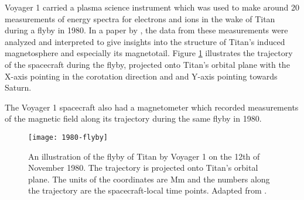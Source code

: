 \documentclass[12pt, parskip=full*, abstract]{scrartcl}
\begin{document}




Voyager 1 carried a plasma science instrument which was used to make around 20 measurements of energy spectra for electrons and ions in the wake of Titan during a flyby in 1980. In a paper by \textcite{hartle-1982}, the data from these measurements were analyzed and interpreted to give insights into the structure of Titan's induced magnetosphere and especially its magnetotail. Figure \ref{1980-flyby} illustrates the trajectory of the spacecraft during the flyby, projected onto Titan's orbital plane with the X-axis pointing in the corotation direction and and Y-axis pointing towards Saturn.

The Voyager 1 spacecraft also had a magnetometer which recorded measurements of the magnetic field along its trajectory during the same flyby in 1980. \textcite{ness-1982}

\begin{figure}[htbp]
	\centering
	\texttt{[image: 1980-flyby]}
	\caption{An illustration of the flyby of Titan by Voyager 1 on the 12th of November 1980. The trajectory is projected onto Titan's orbital plane. The units of the coordinates are \si{\mega\metre} and the numbers along the trajectory are the spacecraft-local time points. Adapted from \textcite{hartle-1982}.}
	\label{1980-flyby}
\end{figure}
\end{document}
